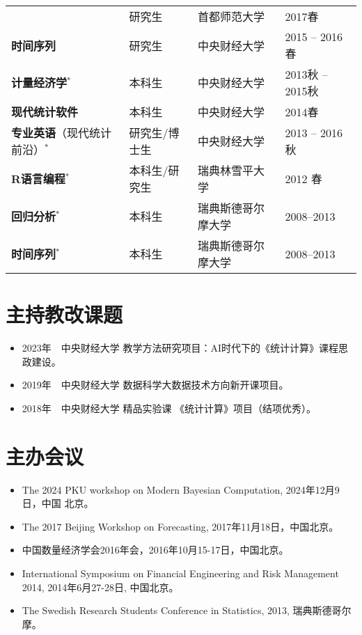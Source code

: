 \documentclass[twoside,a4paper,11pt]{article}
\begin{document}
\begin{tabular}{l l ll}
                                            & 研究生        & 首都师范大学                   & 2017春           \\
  \textbf{时间序列}                         & 研究生        & 中央财经大学                   & 2015 -- 2016春   \\
  \textbf{计量经济学}$^*$                   & 本科生        & 中央财经大学                   & 2013秋 -- 2015秋 \\
  \textbf{现代统计软件}                     & 本科生        & 中央财经大学                   & 2014春           \\
  \textbf{专业英语}（现代统计前沿）$^*$     & 研究生/博士生 & 中央财经大学                   & 2013 -- 2016秋   \\
  \textbf{R语言编程}$^*$                    & 本科生/研究生 & 瑞典林雪平大学                 & 2012 春          \\
  \textbf{回归分析}$^*$                     & 本科生        & 瑞典斯德哥尔摩大学             & 2008--2013       \\
  \textbf{时间序列}$^*$                     & 本科生        & 瑞典斯德哥尔摩大学             & 2008--2013       \\
\bottomrule
\end{tabular}

\section{主持教改课题}

\begin{itemize}
\item 2023年~~中央财经大学 教学方法研究项目：AI时代下的《统计计算》课程思政建设。
\item 2019年~~中央财经大学 数据科学大数据技术方向新开课项目。
\item 2018年~~中央财经大学 精品实验课 《统计计算》项目（结项优秀）。
\end{itemize}

\newpage
\section{主办会议}

\begin{itemize}

\item The 2024 PKU workshop on Modern Bayesian Computation, 2024年12月9日，中国   北京。

\item  The 2017 Beijing Workshop on Forecasting, 2017年11月18日，中国北京。
\item 中国数量经济学会2016年会，2016年10月15-17日，中国北京。

\item International Symposium on Financial Engineering and Risk Management 2014,
  2014年6月27-28日, 中国北京。

\item The Swedish Research Students Conference in Statistics, 2013, 瑞典斯德哥尔摩。
\end{itemize}
\end{document}
